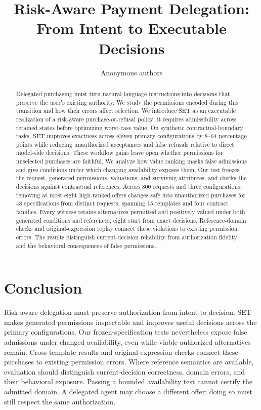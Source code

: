 \documentclass[11pt]{article}
\title{Risk-Aware Payment Delegation:\\From Intent to Executable Decisions}
\author{Anonymous authors}
\date{}
\begin{document}
\maketitle
\begin{abstract}
Delegated purchasing must turn natural-language instructions into decisions that preserve the user's existing authority. We study the permissions encoded during this transition and how their errors affect selection. We introduce SET as an executable realization of a risk-aware purchase-or-refusal policy: it requires admissibility across retained states before optimizing worst-case value. On synthetic contractual-boundary tasks, SET improves exactness across eleven primary configurations by 8--64 percentage points while reducing unauthorized acceptances and false refusals relative to direct model-side decisions. These workflow gains leave open whether permissions for unselected purchases are faithful. We analyze how value ranking masks false admissions and give conditions under which changing availability exposes them. Our test freezes the request, generated permissions, valuations, and surviving attributes, and checks the decisions against contractual references. Across 800 requests and three configurations, removing at most eight high-ranked offers changes safe into unauthorized purchases for 48 specifications from distinct requests, spanning 15 templates and four contract families. Every witness retains alternatives permitted and positively valued under both generated conditions and references; eight start from exact decisions. Reference-domain checks and original-expression replay connect these violations to existing permission errors. The results distinguish current-decision reliability from authorization fidelity and the behavioral consequences of false permissions.
\end{abstract}








\section{Conclusion}
Risk-aware delegation must preserve authorization from intent to decision. SET makes generated permissions inspectable and improves useful decisions across the primary configurations. Our frozen-specification tests nevertheless expose false admissions under changed availability, even while viable authorized alternatives remain. Cross-template results and original-expression checks connect these purchases to existing permission errors. Where reference semantics are available, evaluation should distinguish current-decision correctness, domain errors, and their behavioral exposure. Passing a bounded availability test cannot certify the admitted domain. A delegated agent may choose a different offer; doing so must still respect the same authorization.
\label{mainend}
\end{document}
